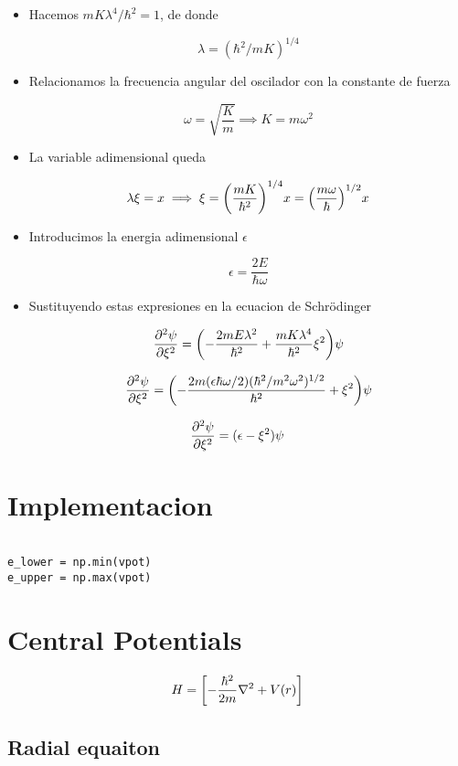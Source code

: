 \documentclass[11pt]{article}
\begin{document}
\begin{itemize}
\item Hacemos \(mK\lambda^4 /\hbar^2 = 1\), de donde

\[ \lambda = (\hbar^2/mK)^{1/4} \]

\item Relacionamos la frecuencia angular del oscilador con la constante de fuerza

\[ \omega = \sqrt{\frac{K}{m}} \implies K = m\omega^2 \]

\item La variable adimensional queda

\[ \lambda\xi = x \implies \xi=\qty(\frac{mK}{\hbar^2})^{1/4} x = \qty(\frac{m \omega}{\hbar})^{1/2} x  \]

\item Introducimos la energia adimensional \(\epsilon\)

\[ \epsilon = \frac{2E}{\hbar \omega} \]

\item Sustituyendo estas expresiones en la ecuacion de Schrödinger

\[ \pdv[2]{\psi}{\xi} = \qty( - \frac{2m E \lambda^{2}}{\hbar^2} + \frac{mK \lambda^4}{\hbar^2} \xi^2  )\psi \]

\[ \pdv[2]{\psi}{\xi} = \qty( - \frac{2m (\epsilon \hbar \omega/2) (\hbar^2/m^2\omega^2)^{1/2}}{\hbar^2} +  \xi^2  )\psi \]
\end{itemize}


\[ \pdv[2]{\psi}{\xi} = (\epsilon - \xi^2)\psi \]
\section{Implementacion}
\label{sec:org3b0afb1}



\begin{verbatim}

e_lower = np.min(vpot)
e_upper = np.max(vpot)

\end{verbatim}
\section{Central Potentials}
\label{sec:org77bf6b4}

\[ H = \qty[ - \frac{\hbar^2}{2m}\nabla^2 + V(r)] \]
\subsection{Radial equaiton}
\label{sec:org663b867}
\end{document}

